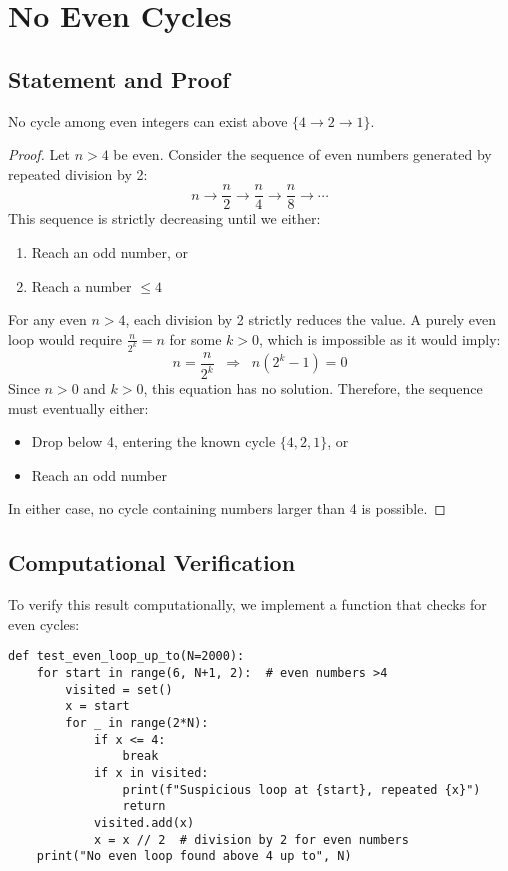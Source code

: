 \section{No Even Cycles}\label{sec:no_even_cycle}

\subsection{Statement and Proof}

\begin{theorem}
No cycle among even integers can exist above $\{4 \to 2 \to 1\}$.
\end{theorem}

\begin{proof}
Let $n > 4$ be even. Consider the sequence of even numbers generated by repeated division by 2:
\[
n \to \frac{n}{2} \to \frac{n}{4} \to \frac{n}{8} \to \cdots
\]
This sequence is strictly decreasing until we either:
\begin{enumerate}
\item Reach an odd number, or
\item Reach a number $\leq 4$
\end{enumerate}

For any even $n > 4$, each division by 2 strictly reduces the value. A purely even loop would require $\frac{n}{2^k} = n$ for some $k > 0$, which is impossible as it would imply:
\[
n = \frac{n}{2^k} \;\;\Rightarrow\;\; n(2^k - 1) = 0
\]
Since $n > 0$ and $k > 0$, this equation has no solution. Therefore, the sequence must eventually either:
\begin{itemize}
\item Drop below 4, entering the known cycle $\{4,2,1\}$, or
\item Reach an odd number
\end{itemize}
In either case, no cycle containing numbers larger than 4 is possible.
\end{proof}

\subsection{Computational Verification}

To verify this result computationally, we implement a function that checks for even cycles:

\begin{lstlisting}[caption=Even Cycle Verification]
def test_even_loop_up_to(N=2000):
    for start in range(6, N+1, 2):  # even numbers >4
        visited = set()
        x = start
        for _ in range(2*N):
            if x <= 4:
                break
            if x in visited:
                print(f"Suspicious loop at {start}, repeated {x}")
                return
            visited.add(x)
            x = x // 2  # division by 2 for even numbers
    print("No even loop found above 4 up to", N)
\end{lstlisting}

